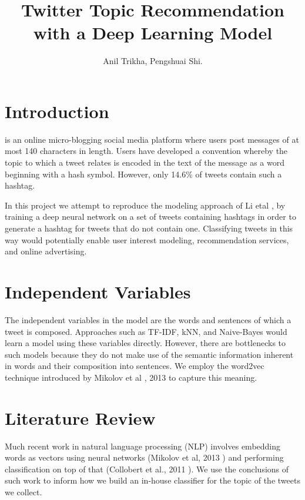 \documentclass[journal, a4paper]{IEEEtran}
\begin{document}
	\title{Twitter Topic Recommendation with a Deep Learning Model}
	\author{Anil Trikha, Pengshuai Shi.}
	\maketitle

\section{Introduction}
	 is an online micro-blogging social media platform where users post messages of at most 140 characters in length. Users have developed a convention whereby the topic to which a tweet relates is encoded in the text of the message as a word beginning with a hash symbol. However, only 14.6\% of tweets contain such a hashtag.

	
	In this project we attempt to reproduce the modeling approach of Li etal \cite{Li-lstm}, by training a deep neural network on a set of tweets containing hashtags in order to generate a hashtag for tweets that do not contain one. Classifying tweets in this way would potentially enable user interest modeling, recommendation services, and online advertising.
\section{Independent Variables}
The independent variables in the model are the words and sentences of which a tweet is composed. Approaches such as TF-IDF, kNN, and Naive-Bayes would learn a model using these variables directly. However, there are bottlenecks to such models because they do not make use of the semantic information inherent in words and their composition into sentences. We employ the word2vec technique introduced by Mikolov et al \cite{word2vec}, 2013 to capture this meaning.
\section{Literature Review}
	Much recent work in natural language processing (NLP) involves embedding words as vectors using neural networks (Mikolov et al, 2013 \cite{word2vec}) and performing classification on top of that (Collobert et al., 2011 \cite{classw2v}). We use the conclusions of such work to inform how we build an in-house classifier for the topic of the tweets we collect.
\end{document}
